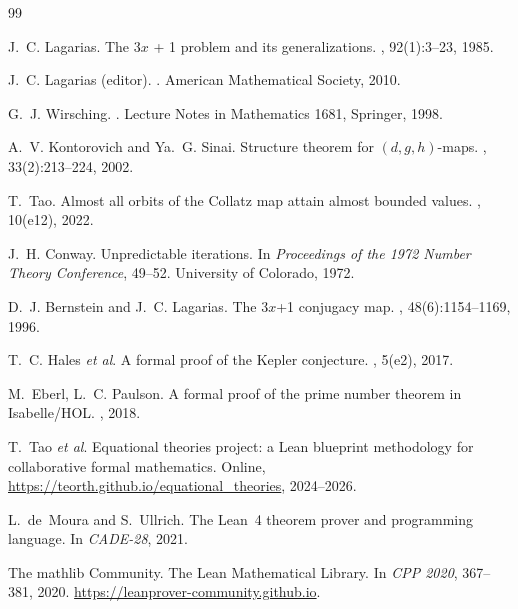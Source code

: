 \documentclass[11pt,a4paper]{article}
\theoremstyle{plain}
\theoremstyle{definition}
\theoremstyle{plain}
\begin{document}

\begin{thebibliography}{99}

J.~C. Lagarias.
\newblock The 3$x$ + 1 problem and its generalizations.
, 92(1):3--23, 1985.

J.~C. Lagarias (editor).
.
\newblock American Mathematical Society, 2010.

G.~J. Wirsching.
.
\newblock Lecture Notes in Mathematics 1681, Springer, 1998.

A.~V. Kontorovich and Ya.~G. Sinai.
\newblock Structure theorem for $(d,g,h)$-maps.
,
33(2):213--224, 2002.

T.~Tao.
\newblock Almost all orbits of the Collatz map attain almost bounded
values.
, 10(e12), 2022.

J.~H. Conway.
\newblock Unpredictable iterations.
\newblock In {\em Proceedings of the 1972 Number Theory Conference},
49--52. University of Colorado, 1972.

D.~J. Bernstein and J.~C. Lagarias.
\newblock The 3$x$+1 conjugacy map.
, 48(6):1154--1169, 1996.

T.~C. Hales \emph{et al}.
\newblock A formal proof of the Kepler conjecture.
, 5(e2), 2017.

M.~Eberl, L.~C. Paulson.
\newblock A formal proof of the prime number theorem in Isabelle/HOL.
, 2018.

T.~Tao \emph{et al}.
\newblock Equational theories project: a Lean blueprint methodology
for collaborative formal mathematics.
\newblock Online, \url{https://teorth.github.io/equational_theories},
2024--2026.

L.~de~Moura and S.~Ullrich.
\newblock The Lean~4 theorem prover and programming language.
\newblock In {\em CADE-28}, 2021.

The mathlib Community.
\newblock The Lean Mathematical Library.
\newblock In {\em CPP 2020}, 367--381, 2020.
\newblock \url{https://leanprover-community.github.io}.


\end{thebibliography}
\end{document}
